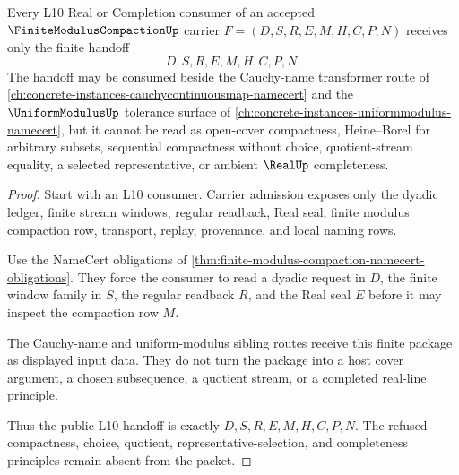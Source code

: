 \begin{theorem}\label{thm:finite-modulus-compaction-l10-handoff}
Every L10 Real or Completion consumer of an accepted $\FiniteModulusCompactionUp$ carrier $F=(D,S,R,E,M,H,C,P,N)$ receives only the finite handoff
$$
D,S,R,E,M,H,C,P,N .
$$
The handoff may be consumed beside the Cauchy-name transformer route of \autoref{ch:concrete-instances-cauchycontinuousmap-namecert} and the $\UniformModulusUp$ tolerance surface of \autoref{ch:concrete-instances-uniformmodulus-namecert}, but it cannot be read as open-cover compactness, Heine--Borel for arbitrary subsets, sequential compactness without choice, quotient-stream equality, a selected representative, or ambient $\RealUp$ completeness.
\end{theorem}
\begin{proof}
Start with an L10 consumer. Carrier admission exposes only the dyadic ledger, finite stream windows, regular readback, Real seal, finite modulus compaction row, transport, replay, provenance, and local naming rows.

Use the NameCert obligations of \autoref{thm:finite-modulus-compaction-namecert-obligations}. They force the consumer to read a dyadic request in $D$, the finite window family in $S$, the regular readback $R$, and the Real seal $E$ before it may inspect the compaction row $M$.

The Cauchy-name and uniform-modulus sibling routes receive this finite package as displayed input data. They do not turn the package into a host cover argument, a chosen subsequence, a quotient stream, or a completed real-line principle.

Thus the public L10 handoff is exactly $D,S,R,E,M,H,C,P,N$. The refused compactness, choice, quotient, representative-selection, and completeness principles remain absent from the packet.
\end{proof}



